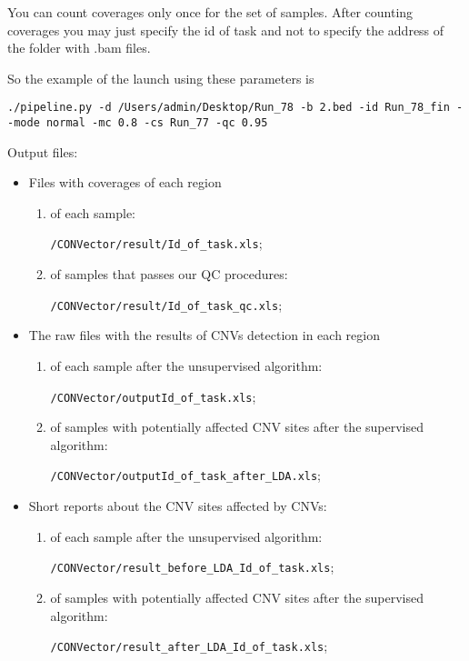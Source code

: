 \documentclass{article}
\begin{document}
You can count coverages only once for the set of samples. After counting coverages you may just specify the id of task and not to specify the address of the folder with .bam files.

So the example of the launch using these parameters is
\begin{lstlisting}[style=DOS, caption={Example of launch with all parameters specified}]
./pipeline.py -d /Users/admin/Desktop/Run_78 -b 2.bed -id Run_78_fin --mode normal -mc 0.8 -cs Run_77 -qc 0.95
\end{lstlisting}

\hfill \break





{\Large Output files:}
\begin{itemize}
\item Files with coverages of each region 
      \begin{enumerate}
      \item of each sample: 
      
      \texttt{/CONVector/result/Id\_of\_task.xls};
      \item of samples that passes our QC procedures: 
      
      \texttt{/CONVector/result/Id\_of\_task\_qc.xls};
      \end{enumerate}
\item The raw files with the results of CNVs detection in each region
      \begin{enumerate}
      \item of each sample after the unsupervised algorithm: 
      
      \texttt{/CONVector/outputId\_of\_task.xls};
      \item of samples with potentially affected CNV sites after the supervised algorithm: 
      
      \texttt{/CONVector/outputId\_of\_task\_after\_LDA.xls};
      \end{enumerate}
\item Short reports about the CNV sites affected by CNVs:
      \begin{enumerate}
      \item of each sample after the unsupervised algorithm: 
      
      \texttt{/CONVector/result\_before\_LDA\_Id\_of\_task.xls};
      \item of samples with potentially affected CNV sites after the supervised algorithm: 
     
      \texttt{/CONVector/result\_after\_LDA\_Id\_of\_task.xls};
      \end{enumerate}
\end{itemize}
\end{document}
